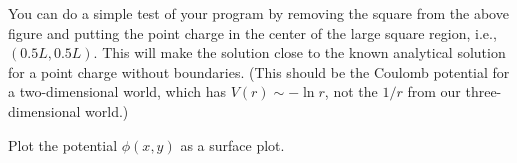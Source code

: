 You can do a simple test of your program by
removing the square from the above figure and putting the point charge in the center of the
large square region, i.e., \((0.5L, 0.5L)\). This will make the solution close to the known
analytical solution for a point charge without boundaries. (This should be the Coulomb
potential for a two-dimensional world, which has \(V(r) \sim -\ln r\), not the \(1 / r\)
from our three-dimensional world.)

Plot the potential \(\phi(x, y)\) as a surface plot.
\newline
